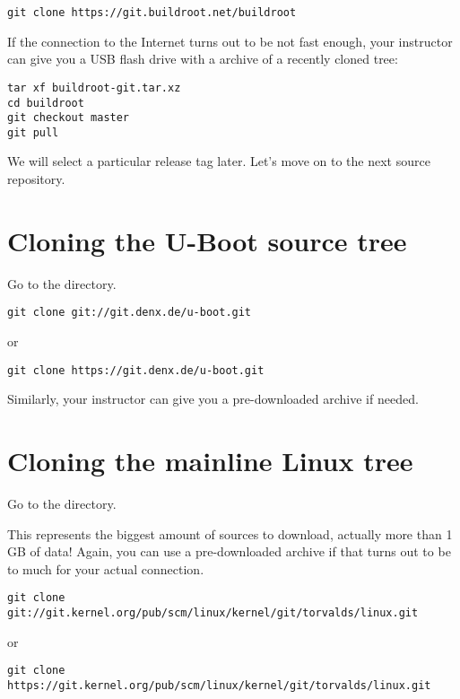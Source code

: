\begin{verbatim}
git clone https://git.buildroot.net/buildroot
\end{verbatim}

If the connection to the Internet turns out to be not fast enough,
your instructor can give you a USB flash drive with a
 archive of a recently cloned tree:

\begin{verbatim}
tar xf buildroot-git.tar.xz
cd buildroot
git checkout master
git pull
\end{verbatim}

We will select a particular release tag later. Let's move on to the next
source repository.

\section{Cloning the U-Boot source tree}

Go to the  directory.

\begin{verbatim}
git clone git://git.denx.de/u-boot.git
\end{verbatim}

or

\begin{verbatim}
git clone https://git.denx.de/u-boot.git
\end{verbatim}

Similarly, your instructor can give you a pre-downloaded archive if
needed.

\section{Cloning the mainline Linux tree}

Go to the  directory.

This represents the biggest amount of sources to download, actually more
than 1 GB of data! Again, you can use a pre-downloaded archive if that
turns out to be to much for your actual connection.

{\small
\begin{verbatim}
git clone git://git.kernel.org/pub/scm/linux/kernel/git/torvalds/linux.git
\end{verbatim}
}

or

{\small
\begin{verbatim}
git clone https://git.kernel.org/pub/scm/linux/kernel/git/torvalds/linux.git
\end{verbatim}
}

